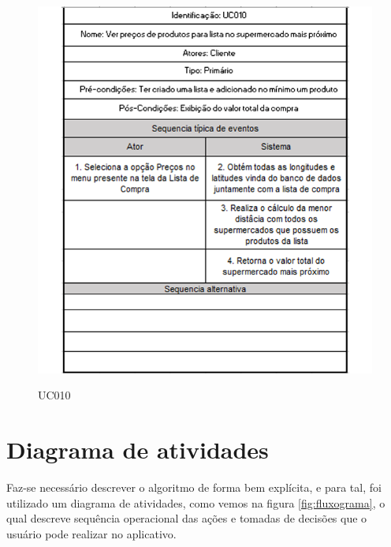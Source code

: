 \begin{figure}[H]
	\centering
		\caption{UC010}
		\includegraphics[scale=0.8]{Imagens/UC010.PNG}
		\label{fig:UC010}	
\end{figure}


\section{Diagrama de atividades}
	Faz-se necessário descrever o algoritmo de forma bem explícita, e para tal, foi utilizado um diagrama de atividades, como vemos na figura \ref{fig:fluxograma}, o qual descreve sequência operacional das ações e tomadas de decisões que o usuário pode realizar no aplicativo.
	
